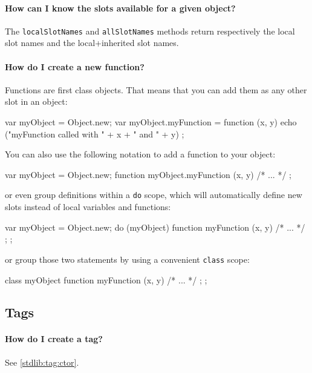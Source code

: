 \paragraph{How can I know the slots available for a given object?}
The \lstinline{localSlotNames} and \lstinline{allSlotNames} methods
return respectively the local slot names and the local+inherited slot
names.

\paragraph{How do I create a new function?}
Functions are first class objects. That means that you can add them as
any other slot in an object:

\begin{urbifixme}
var myObject = Object.new;
var myObject.myFunction = function (x, y)
  { echo ("myFunction called with " + x + " and " + y) };
\end{urbifixme}

You can also use the following notation to add a function to your
object:

\begin{urbifixme}
var myObject = Object.new;
function myObject.myFunction (x, y) { /* ... */ };
\end{urbifixme}

\noindent
or even group definitions within a \lstinline{do} scope, which will
automatically define new slots instead of local variables and
functions:

\begin{urbifixme}
var myObject = Object.new;
do (myObject) {
  function myFunction (x, y) { /* ... */ };
};
\end{urbifixme}

\noindent
or group those two statements by using a convenient \lstinline{class}
scope:

\begin{urbifixme}
class myObject {
  function myFunction (x, y) { /* ... */ };
};
\end{urbifixme}


\subsection{Tags}
\paragraph{How do I create a tag?}
See \autoref{stdlib:tag:ctor}.

